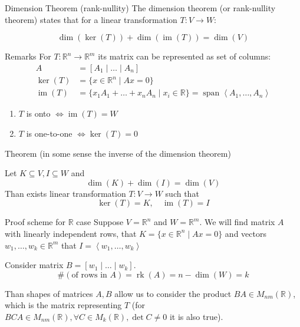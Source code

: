 \documentclass[fullscreen=true, bookmarks=true, hyperref={pdfencoding=unicode}]{beamer}
\begin{document}
\begin{frame}
  \begin{block}{Dimension Theorem (rank-nullity)}
    The dimension theorem (or rank-nullity theorem) states that for a linear transformation $T: V \rightarrow W$:
    
    \[
    \operatorname{dim}(\operatorname{ker}(T)) + \operatorname{dim}(\operatorname{im}(T)) = \operatorname{dim}(V)
    \]
  \end{block}

  \begin{block}{Remarks}
    For $T: \mathbb{R}^n \rightarrow \mathbb{R}^m$ its matrix can be represented as set of columns:
    \begin{align*}
      A &= [A_1\mid \dots \mid A_n] \\
      \operatorname{ker}(T) &= \{x \in \mathbb{R}^n \mid Ax = 0 \} \\
      \operatorname{im}(T) &= \{x_1A_1 + \dots + x_nA_n \mid x_i \in \mathbb{R}\} = \operatorname{span}\left<A_1, \dots, A_n \right>
    \end{align*}
    \begin{enumerate}
      \item $T$ is onto $\Leftrightarrow \operatorname{im}(T) = W$
      \item $T$ is one-to-one $\Leftrightarrow \operatorname{ker}(T) = 0$
    \end{enumerate}
  \end{block}
\end{frame}


\begin{frame}{Theorem}
  (in some sense the inverse of the dimension theorem)
  
  Let $K \subseteq V, I \subseteq W$ and $$ \operatorname{dim}(K) + \operatorname{dim}(I) = \operatorname{dim}(V)$$
  Than exists linear transformation $T: V \rightarrow W$ such that
  $$ \operatorname{ker}(T) = K, \quad \operatorname{im}(T) = I$$
  
  \begin{block}{Proof scheme for $\mathbb{R}$ case}
    \small
    \pause
    Suppose $V = \mathbb{R}^n$ and $W = \mathbb{R}^m$.
    We will find matrix $A$ with linearly independent rows, 
    that $K = \{x \in \mathbb{R}^n \mid Ax = 0\}$ and vectors 
    $w_1, \dots, w_k \in \mathbb{R}^m$ that $I = \left<w_1, \dots, w_k \right>$

    \pause
    Consider matrix $B = [w_1\mid \dots \mid w_k]$. 
    $$ \#(\text{of rows in } A) = \operatorname{rk}(A) = n - \operatorname{dim}(W) = k$$
    
    Than shapes of matrices $A, B$ allow us to consider the 
    product $BA \in M_{nm}(\mathbb{R})$, which is the matrix representing $T$
    (for $BCA \in M_{nm}(\mathbb{R}), \forall C \in M_{k}(\mathbb{R}), \det C \neq 0$ it is also true).
  \end{block}
\end{frame}
\end{document}
